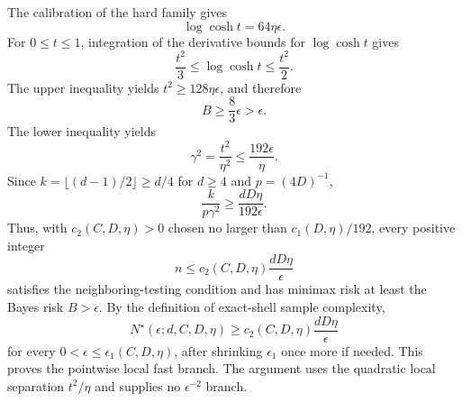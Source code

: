 The calibration of the hard family gives
\[
\log\cosh t=64\eta\epsilon.
\]
For \(0\le t\le1\), integration of the derivative bounds for \(\log\cosh t\) gives
\[
\frac{t^2}{3}\le\log\cosh t\le\frac{t^2}{2}.
\]
The upper inequality yields \(t^2\ge128\eta\epsilon\), and therefore
\[
B\ge\frac{8}{3}\epsilon>\epsilon.
\]
The lower inequality yields
\[
\gamma^2=\frac{t^2}{\eta^2}
\le\frac{192\epsilon}{\eta}.
\]
Since \(k=\lfloor(d-1)/2\rfloor\ge d/4\) for \(d\ge4\) and \(p=(4D)^{-1}\),
\[
\frac{k}{p\gamma^2}
\ge\frac{dD\eta}{192\epsilon}.
\]
Thus, with \(c_2(C,D,\eta)>0\) chosen no larger than \(c_1(D,\eta)/192\), every positive integer
\[
n\le c_2(C,D,\eta)\frac{dD\eta}{\epsilon}
\]
satisfies the neighboring-testing condition and has minimax risk at least the Bayes risk \(B>\epsilon\). By the definition of exact-shell sample complexity,
\[
N^\star(\epsilon;d,C,D,\eta)
\ge c_2(C,D,\eta)\frac{dD\eta}{\epsilon}
\]
for every \(0<\epsilon\le\epsilon_1(C,D,\eta)\), after shrinking \(\epsilon_1\) once more if needed. This proves the pointwise local fast branch. The argument uses the quadratic local separation \(t^2/\eta\) and supplies no \(\epsilon^{-2}\) branch.